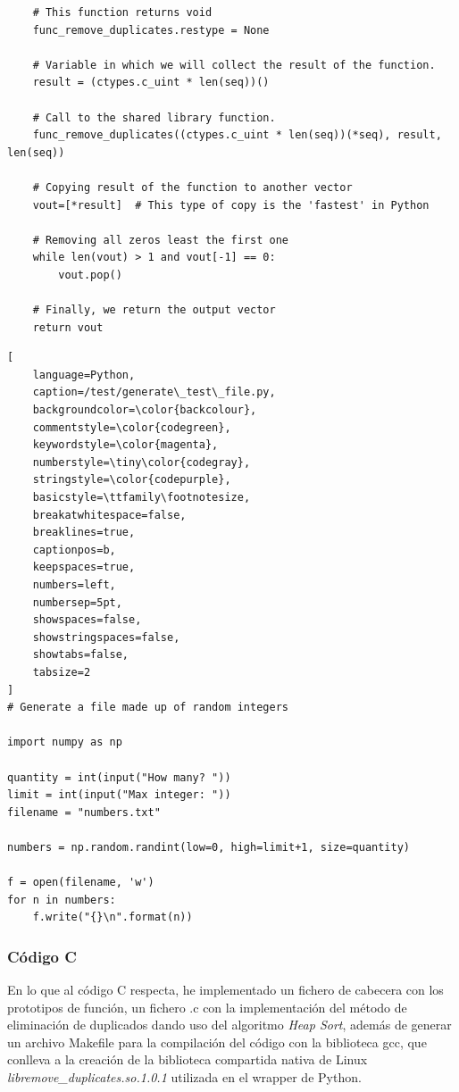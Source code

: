 \documentclass[12 pt]{article}
\begin{document}
\begin{lstlisting}
    # This function returns void
    func_remove_duplicates.restype = None

    # Variable in which we will collect the result of the function.   
    result = (ctypes.c_uint * len(seq))()
    
    # Call to the shared library function.
    func_remove_duplicates((ctypes.c_uint * len(seq))(*seq), result, len(seq))
    
    # Copying result of the function to another vector
    vout=[*result]  # This type of copy is the 'fastest' in Python
        
    # Removing all zeros least the first one
    while len(vout) > 1 and vout[-1] == 0:
        vout.pop()
        
    # Finally, we return the output vector
    return vout

\end{lstlisting}
\newpage
\begin{lstlisting}[
    language=Python,
    caption=/test/generate\_test\_file.py,
    backgroundcolor=\color{backcolour},   
    commentstyle=\color{codegreen},
    keywordstyle=\color{magenta},
    numberstyle=\tiny\color{codegray},
    stringstyle=\color{codepurple},
    basicstyle=\ttfamily\footnotesize,
    breakatwhitespace=false,         
    breaklines=true,                 
    captionpos=b,                    
    keepspaces=true,                 
    numbers=left,                    
    numbersep=5pt,                  
    showspaces=false,                
    showstringspaces=false,
    showtabs=false,                  
    tabsize=2
]
# Generate a file made up of random integers

import numpy as np

quantity = int(input("How many? "))
limit = int(input("Max integer: "))
filename = "numbers.txt"

numbers = np.random.randint(low=0, high=limit+1, size=quantity)

f = open(filename, 'w')
for n in numbers:
    f.write("{}\n".format(n))

\end{lstlisting}

\subsubsection{Código C}
En lo que al código C respecta, he implementado un fichero de cabecera con los prototipos de función, un fichero .c con la implementación del método de eliminación de duplicados dando uso del algoritmo \emph{Heap Sort}, además de generar un archivo Makefile para la compilación del código con la biblioteca gcc, que conlleva a la creación de la biblioteca compartida nativa de Linux \emph{libremove\_duplicates.so.1.0.1} utilizada en el wrapper de Python.
\end{document}
